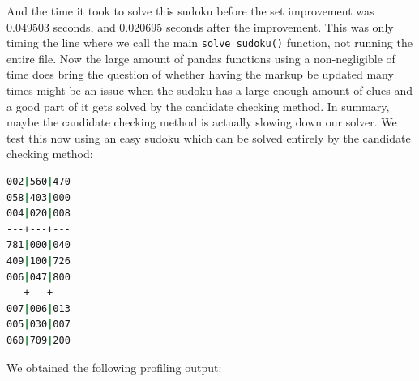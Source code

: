 \documentclass[12pt]{report} %
\begin{document}
And the time it took to solve this sudoku before the set improvement was 0.049503 seconds, and 0.020695 seconds after the improvement. This was only timing the line where we call the main \texttt{solve\_sudoku()} function, not running the entire file. Now the large amount of pandas functions using a non-negligible of time does bring the question of whether having the markup be updated many times might be an issue when the sudoku has a large enough amount of clues and a good part of it gets solved by the candidate checking method. In summary, maybe the candidate checking method is actually slowing down our solver. We test this now using an easy sudoku which can be solved entirely by the candidate checking method:

\begin{lstlisting}[language=Bash]
002|560|470
058|403|000
004|020|008
---+---+---
781|000|040
409|100|726
006|047|800
---+---+---
007|006|013
005|030|007
060|709|200
\end{lstlisting}


We obtained the following profiling output:
\end{document}
